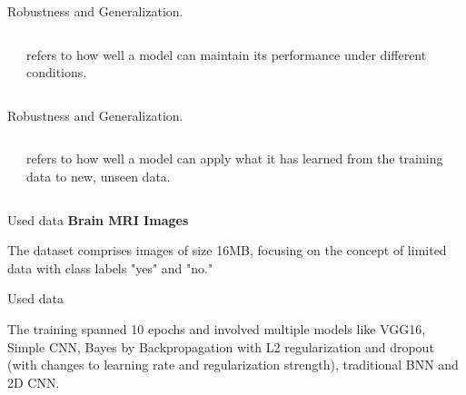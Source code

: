 \documentclass[aspectratio=169,xcolor=dvipsnames, t]{beamer}
\begin{document}
\begin{frame}{Robustness and Generalization.}
    \begin{columns}
    \begin{column}{0.45\textwidth}
       
    \end{column}
    \begin{column}{0.45\textwidth}  %
        refers to how well a model can maintain its performance under different conditions.
    \end{column}
    \end{columns}
\end{frame}
\begin{frame}{Robustness and Generalization.}
    \begin{columns}
    \begin{column}{0.45\textwidth}
       
    \end{column}
    \begin{column}{0.45\textwidth}  %
        refers to how well a model can apply what it has learned from the training data to new, unseen data.
    \end{column}
    \end{columns}
\end{frame}




\begin{frame}{Used data}
\textbf{Brain MRI Images}

The dataset comprises images of size 16MB, focusing on the concept of limited data with class labels "yes" and "no." 

\end{frame}


\begin{frame}{Used data}
   
The training spanned 10 epochs and involved multiple models like VGG16, Simple CNN, Bayes by Backpropagation with L2 regularization and dropout (with changes to learning rate and regularization strength), traditional BNN and 2D CNN.

\end{frame}
\end{document}
